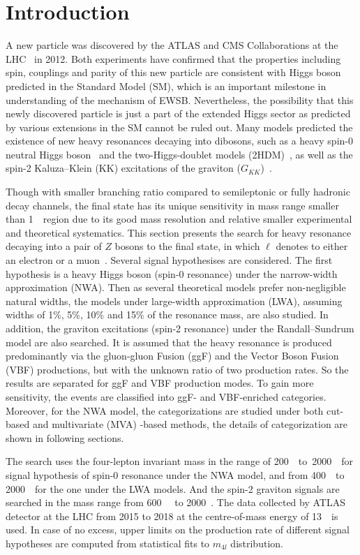 \section{Introduction}

A new particle was discovered by the ATLAS and CMS Collaborations at the LHC~\cite{20121, 201230} in 2012.
Both experiments have confirmed that the properties including spin, couplings and parity of this new particle are consistent with 
Higgs boson predicted in the Standard Model (SM), which is an important milestone in understanding of the mechanism of EWSB.
Nevertheless, the possibility that this newly discovered particle is just a part of the extended Higgs sector
as predicted by various extensions in the SM cannot be ruled out.
Many models predicted the existence of new heavy resonances decaying into dibosons, 
such as a heavy spin-0 neutral Higgs boson~\cite{PhysRevD.36.3463}
and the two-Higgs-doublet models (2HDM)~\cite{BRANCO20121}, 
as well as the spin-2 Kaluza–Klein (KK) excitations of the graviton ($G_{KK}$)~\cite{DAVOUDIASL200043}.

Though with smaller branching ratio compared to semileptonic or fully hadronic decay channels, the \llll final state has its unique sensitivity in mass range smaller than 1~\tev~region 
due to its good mass resolution and relative smaller experimental and theoretical systematics.
This section presents the search for heavy resonance decaying into a pair of $Z$ bosons to the \llll final state, in which $\ell$ denotes to either an electron or a muon~\cite{Aaboud:2017rel, Aad:2020fpj}. 
Several signal hypothesises are considered.
The first hypothesis is a heavy Higgs boson (spin-0 resonance) under the narrow-width approximation (NWA).
Then as several theoretical models prefer non-negligible natural widths, the models under large-width approximation (LWA), 
assuming widths of 1\%, 5\%, 10\% and 15\% of the resonance mass, are also studied.
In addition, the graviton excitations (spin-2 resonance) under the Randall–Sundrum model are also searched.
It is assumed that the heavy resonance is produced predominantly via the gluon-gluon Fusion (ggF) and the Vector Boson Fusion (VBF) productions, 
but with the unknown ratio of two production rates.
So the results are separated for ggF and VBF production modes.
To gain more sensitivity, the \llll events are classified into  ggF- and VBF-enriched categories.
Moreover, for the NWA model, the categorizations are studied under both cut-based and multivariate (MVA) -based methods, the details of categorization are shown in following sections.

The search uses the four-lepton invariant mass in the range of 200~\gev~to~2000~\gev~for signal hypothesis of spin-0 resonance under the NWA model,
and from 400~\gev~to 2000~\gev~for the one under the LWA models.
And the spin-2 graviton signals are searched in the mass range from 600~\gev~ to 2000~\gev.
The data collected by ATLAS detector at the LHC from 2015 to 2018 at the centre-of-mass energy of 13~\tev~is used.
In case of no excess, upper limits on the production rate of different signal hypotheses are computed from statistical fits to $m_{4l}$ distribution.


